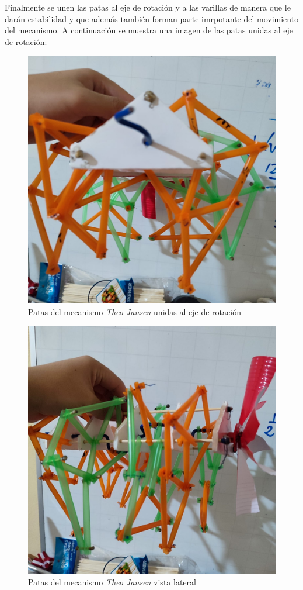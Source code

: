 \begin{multicols}{2}
Finalmente se unen las patas al eje de rotación  y a las varillas de manera que le darán estabilidad y que además también forman parte imrpotante del movimiento del mecanismo. A continuación se muestra una imagen de las patas unidas al eje de rotación:
\begin{figure}[H]
  \centering
  \includegraphics[width=0.6\linewidth]{./assets/patas.jpeg}
  \caption{Patas del mecanismo \textit{Theo Jansen} unidas al eje de rotación}
  \label{fig:patas_eje}
\end{figure}
\begin{figure}[H]
  \centering
  \includegraphics[width=0.6\linewidth]{./assets/patas2.jpeg}
  \caption{Patas del mecanismo \textit{Theo Jansen} vista lateral}
  \label{fig:patas_eje_lateral}
\end{figure}
\end{multicols}
\newpage
